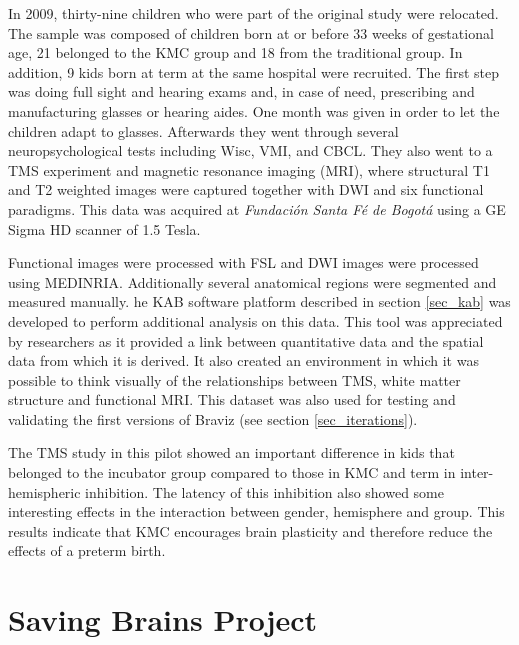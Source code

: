 In 2009, thirty-nine children who were part of the original study were relocated. The sample was composed of children born at or before 33 weeks of gestational age, 21 belonged to the KMC group and 18 from the traditional group. In addition, 9 kids born at term at the same hospital were recruited. 
The first step was doing full sight and hearing exams and, in case of need, prescribing and manufacturing glasses or hearing aides. One month was given in order to let the children adapt to glasses. Afterwards they went through several neuropsychological tests including Wisc, VMI, and CBCL. They also went to a TMS experiment and magnetic resonance imaging (MRI), where structural T1 and T2 weighted images were captured together with DWI and six functional paradigms. This data was acquired at \emph{Fundación Santa Fé de Bogotá} using a GE Sigma HD scanner of 1.5 Tesla. 







Functional images were processed with FSL and DWI images were processed using MEDINRIA. Additionally several anatomical regions were segmented and measured manually. he KAB software platform described in section \ref{sec_kab} was developed to perform additional analysis on this data. This tool was appreciated by researchers as it provided a link between quantitative data and the spatial data from which it is derived. It also created an environment in which it was possible to think visually of the relationships between TMS, white matter structure and functional MRI. This dataset was also used for testing and validating the first versions of Braviz (see section \ref{sec_iterations}).

The TMS study in this pilot showed an important difference in kids that belonged to the incubator group compared to those in KMC and term \autocite{schneider_cerebral_2012} in inter-hemispheric inhibition. The latency of this inhibition also showed some interesting effects in the interaction between gender, hemisphere and group. This results indicate that KMC encourages brain plasticity and therefore reduce the effects of a preterm birth. 


\section{Saving Brains Project}

